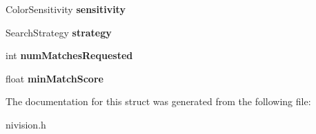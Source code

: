 \begin{DoxyCompactItemize}
\item 
\hypertarget{structMatchColorPatternOptions__struct_a8aae7a7c45039c97078e67496cba7ce4}{\-Color\-Sensitivity {\bfseries sensitivity}}\label{structMatchColorPatternOptions__struct_a8aae7a7c45039c97078e67496cba7ce4}

\item 
\hypertarget{structMatchColorPatternOptions__struct_a03d60ed16f920ca07e649af96773db15}{\-Search\-Strategy {\bfseries strategy}}\label{structMatchColorPatternOptions__struct_a03d60ed16f920ca07e649af96773db15}

\item 
\hypertarget{structMatchColorPatternOptions__struct_ad6212a25d7c1eefbfb90e5dd1a8a6bd1}{int {\bfseries num\-Matches\-Requested}}\label{structMatchColorPatternOptions__struct_ad6212a25d7c1eefbfb90e5dd1a8a6bd1}

\item 
\hypertarget{structMatchColorPatternOptions__struct_a1f1df0042a1fec9617ff589c08b9047a}{float {\bfseries min\-Match\-Score}}\label{structMatchColorPatternOptions__struct_a1f1df0042a1fec9617ff589c08b9047a}

\end{DoxyCompactItemize}


\-The documentation for this struct was generated from the following file\-:\begin{DoxyCompactItemize}
\item 
nivision.\-h\end{DoxyCompactItemize}
